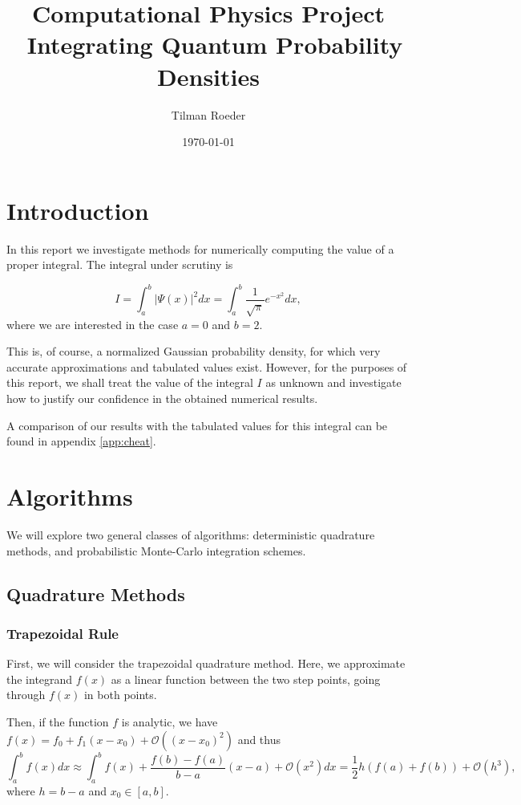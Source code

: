 \documentclass[10pt, a4paper]{article}
\title{Computational Physics Project \\ Integrating Quantum Probability Densities}
\author{Tilman Roeder}
\date{\today}
\begin{document}
\maketitle

\section{Introduction}
In this report we investigate methods for numerically computing the value of a proper integral.
The integral under scrutiny is

\begin{equation}
\label{eq:target}
I = \int_a^b |\Psi(x)|^2 dx = \int_a^b \frac{1}{\sqrt{\pi}} e^{-x^2} dx,
\end{equation}
where we are interested in the case $a = 0$ and $b = 2$.

This is, of course, a normalized Gaussian probability density, for which
very accurate approximations and tabulated values exist. However, for the purposes of this report, we shall
treat the value of the integral $I$ as unknown and investigate how to justify our confidence in the
obtained numerical results.

A comparison of our results with the tabulated values for this integral can be found in appendix
\ref{app:cheat}.

\section{Algorithms}
\label{sec:algo}
We will explore two general classes of algorithms: deterministic quadrature methods, and probabilistic
Monte-Carlo integration schemes.

\subsection{Quadrature Methods}
  \subsubsection{Trapezoidal Rule}
  \label{sec:trap}
  First, we will consider the trapezoidal quadrature method. Here, we approximate the integrand $f(x)$
  as a linear function between the two step points, going through $f(x)$ in both points.

  Then, if the function $f$ is analytic, we have $f(x) = f_0 + f_1 (x-x_0) + \mathcal{O}((x-x_0)^2)$\footnotemark
  and thus
  \begin{equation}
  \int_a^b f(x) dx \approx
  \int_a^b f(x) + \frac{f(b) - f(a)}{b-a} (x-a) + \mathcal{O}(x^2) dx =
  \frac{1}{2} h (f(a) + f(b)) + \mathcal{O}(h^3),
  \end{equation}
  where $h = b-a$ and $x_0 \in [a,b]$.
\end{document}
